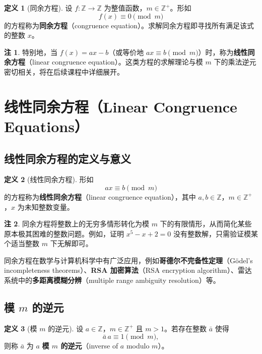 \documentclass[UTF8,11pt,a4paper]{ctexbook}   %
\theoremstyle{definition}
\newtheorem{definition}{定义}[section]
\newtheorem{remark}{注}[section]
\begin{document}
\begin{definition}[同余方程]
设 $f:\mathbb{Z}\to\mathbb{Z}$ 为整值函数，$m\in\mathbb{Z}^+$。形如
\[
f(x)\equiv 0\pmod m
\]
的方程称为\textbf{同余方程}（congruence equation）。求解同余方程即寻找所有满足该式的整数 $x$。
\end{definition}

\begin{remark}
特别地，当 $f(x)=ax-b$（或等价地 $ax\equiv b\pmod m$）时，称为\textbf{线性同余方程}（linear congruence equation）。这类方程的求解理论与模 $m$ 下的乘法逆元密切相关，将在后续课程中详细展开。
\end{remark}

\section{线性同余方程（Linear Congruence Equations）}

\subsection{线性同余方程的定义与意义}

\begin{definition}[线性同余方程]
形如
\[
ax \equiv b \pmod m
\]
的方程称为\textbf{线性同余方程}（linear congruence equation），其中 $a,b\in\mathbb{Z}$，$m\in\mathbb{Z}^+$，$x$ 为未知整数变量。
\end{definition}

\begin{remark}
同余方程将整数上的无穷多情形转化为模 $m$ 下的有限情形，从而简化某些原本极其困难的整数问题。例如，证明 $x^5-x+2=0$ 没有整数解，只需验证模某个适当整数 $m$ 下无解即可。

同余方程在数学与计算机科学中有广泛应用，例如\textbf{哥德尔不完备性定理}（Gödel's incompleteness theorems）、\textbf{RSA 加密算法}（RSA encryption algorithm）、雷达系统中的\textbf{多距离模糊分辨}（multiple range ambiguity resolution）等。
\end{remark}

\subsection{模 \texorpdfstring{$m$}{m} 的逆元}

\begin{definition}[模 $m$ 的逆元]
设 $a\in\mathbb{Z}$，$m\in\mathbb{Z}^+$ 且 $m>1$。若存在整数 $\bar{a}$ 使得
\[
\bar{a}\,a \equiv 1 \pmod m,
\]
则称 $\bar{a}$ 为 $a$ \textbf{模 $m$ 的逆元}（inverse of $a$ modulo $m$）。
\end{definition}
\end{document}
